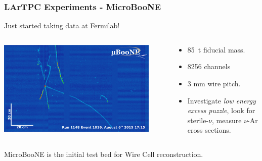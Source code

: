 \documentclass[xcolor=dvipsnames]{beamer}
\begin{document}
\begin{frame}
  \frametitle{LArTPC Experiments - MicroBooNE}

  \begin{center}
    Just started taking data at Fermilab!    
  \end{center}

  \begin{columns}
    \begin{column}{0.5\textwidth}
      \begin{center}
        \includegraphics[width=0.9\textwidth]{run1148_ev1016.png}
      \end{center}

    \end{column}
    \begin{column}{0.5\textwidth}
      \begin{itemize}
      \item \SI{85}{\tonne} fiducial mass.
      \item 8256 channels
      \item 3 mm wire pitch.
      \item Investigate \textit{low energy excess puzzle}, look for sterile-$\nu$, measure $\nu$-Ar
        cross sections.
      \end{itemize}
    \end{column}
  \end{columns}


  \begin{center}
    MicroBooNE is the initial test bed for Wire Cell reconstruction.    
  \end{center}

\end{frame}
\end{document}
